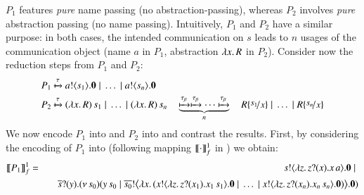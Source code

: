 \documentclass[preprint,11pt]{elsarticle}
\begin{document}
{%
 $P_1$ features \emph{pure} name passing (no abstraction-passing), whereas 
$P_2$ involves \emph{pure} abstraction passing (no name passing). Intuitively, 
$P_1$ and $P_2$ have a similar purpose:
in both cases, 
the intended communication on $s$ leads to $n$ usages of the communication object (name $a$ in $P_1$, abstraction $\lambda x.\,R$ in $P_2$).
Consider now the reduction steps from $P_1$ and $P_2$:
\begin{align*}
P_1  \hby{\tau} ~& \bout{a}{s_1} \inact \Par \dots \Par \bout{a}{s_n} \inact \\
P_2  \hby{\tau}~& \appl{(\abs{x}{R})}{s_1} \Par \dots \Par \appl{(\abs{x}{R})}{s_n} \quad 
\underbrace{\hby{\btau}\hby{\btau} \cdots \hby{\btau}}_{n} 
\quad R \subst{s_1}{x} \Par \dots \Par R \subst{s_n}{x} 
\end{align*}
We now encode $P_1$ into \HO and $P_2$ into \sessp and contrast the results. 
First, by considering the encoding of $P_1$ into \HO  (following mapping $\llbracket\cdot\rrbracket^1_f$ in )
we obtain:
\begin{eqnarray*}
\map{P_1}^{1}_f & = &  	\bout{s}{\abs{z}{\binp{z}{x} \appl{x}{a}}} \inact \Par \\
& &  \quad \binp{\dual{s}}{y} \newsp{s_0}{\appl{y}{s_0} \Par \bbout{\dual{s_0}}{\abs{x}{(\bout{x}{\abs{z}{\binp{z}{x_1} \appl{x_1}{s_1}}} \inact \Par \dots \Par \bout{x}{\abs{z}{\binp{z}{x_n} \appl{x_n}{s_n}}} \inact)}} \inact}\\

\end{eqnarray*}}
\end{document}
